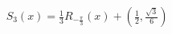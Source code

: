\documentclass[preview]{standalone}
\begin{document}
\begin{align*}
& S_3(x)=\textstyle\frac{1}{3}R_{-\frac{\pi}{3}}(x) + \left(\textstyle\frac{1}{2},\textstyle\frac{\sqrt{3}}{6}\right) \\
\end{align*}
\end{document}
